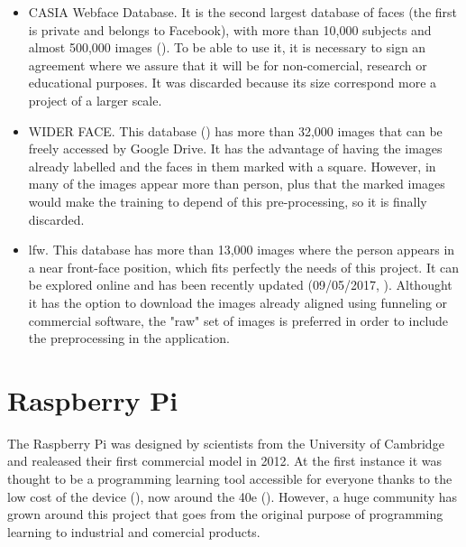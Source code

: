 \begin{itemize}
	\item CASIA Webface Database. It is the second largest database of faces (the first is private and belongs to Facebook), with more than 10,000 subjects and almost 500,000 images (\cite{casia_db}). To be able to use it, it is necessary to sign an agreement where we assure that it will be for non-comercial, research or educational purposes. It was discarded because its size correspond more a project of a larger scale. 
	\item WIDER FACE. This database (\cite{widerf_db}) has more than 32,000 images that can be freely accessed by Google Drive. It has the advantage of having the images already labelled and the faces in them marked with a square. However, in many of the images appear more than person, plus that the marked images would make the training to depend of this pre-processing, so it is finally discarded.
	\item \gls{lfw}. This database has more than 13,000 images where the person appears in a near front-face position, which fits perfectly the needs of this project. It can be explored online and has been recently updated (09/05/2017, \cite{lfw_db}). Althought it has the option to download the images already aligned using funneling or commercial software, the "raw" set of images is preferred in order to include the preprocessing in the application.
\end{itemize}



                                                                         
\section{Raspberry Pi}	
\label{sec:rasp_pi}
The Raspberry Pi was designed by scientists from the University of Cambridge and realeased their first commercial model in 2012. At the first instance it was thought to be a programming learning tool accessible for everyone thanks to the low cost of the device (\cite{raspberry_pi_for_learning}), now around the 40e (\cite{price_raspberry_pi}). However, a huge community has grown around this project that goes from the original purpose of programming learning to industrial and comercial products.

